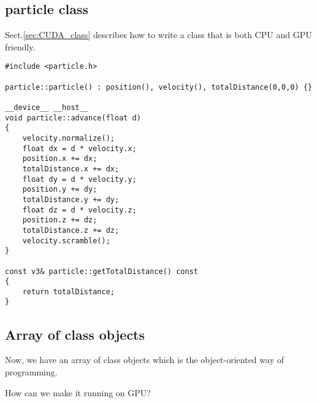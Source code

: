 \subsection{particle class}


Sect.\ref{sec:CUDA_class} describes how to write a class that is both CPU and GPU friendly.

\begin{verbatim}
#include <particle.h>

particle::particle() : position(), velocity(), totalDistance(0,0,0) {}

__device__ __host__ 
void particle::advance(float d)
{
    velocity.normalize();
    float dx = d * velocity.x;
    position.x += dx;
    totalDistance.x += dx;
    float dy = d * velocity.y;
    position.y += dy;
    totalDistance.y += dy;
    float dz = d * velocity.z;
    position.z += dz;
    totalDistance.z += dz;
    velocity.scramble();
}

const v3& particle::getTotalDistance() const
{
    return totalDistance; 
}
\end{verbatim}


\subsection{Array of class objects}

Now, we have an array of class objects which is the object-oriented way of programming. 

How can we make it running on GPU?

